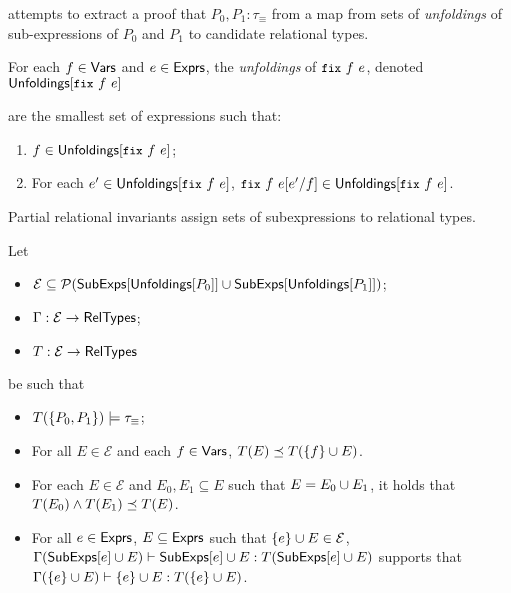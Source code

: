 \sys attempts to extract a proof that $P_0, P_1 : \tau_{\equiv}$ from
a map from sets of \emph{unfoldings} of sub-expressions of $P_0$
and $P_1$ to candidate relational types.
%
\begin{defn}
  \label{defn:unfoldings}
  For each $f \in \mathsf{Vars}$ and $e \in \mathsf{Exprs}$, the \emph{unfoldings} of
  $\fix{f}{e}$, denoted $\unfoldings{ \fix{f}{e} }$

 are the smallest set of expressions such that:
  \begin{enumerate}
  \item $f \in \unfoldings{ \fix{f}{e} }$;
  \item For each $e' \in \unfoldings{ \fix{f}{e} }$, $\replace{
      \fix{f}{e} }{ f }{ e' } \in \unfoldings{ \fix{f}{e} }$.
  \end{enumerate}
\end{defn}
%
%

%
Partial relational invariants assign sets of subexpressions to
relational types.
%
\begin{defn}
  \label{defn:inferred-invs}
  Let
  \begin{itemize}
  \item 
    $\mathcal{E} \subseteq \mathcal{P}(\mathsf{SubExps}[  \mathsf{Unfoldings}[ P_0 ]  ] \cup
      \mathsf{SubExps}[ \mathsf{Unfoldings}[ P_1 ]  ])$;
  \item
    $\Gamma : \mathcal{E} \to \mathsf{RelTypes}$;
  \item
    $T : \mathcal{E} \to \mathsf{RelTypes}$
  \end{itemize}
  be such that 
  \begin{itemize}
  \item 
    $T( \{  P_0, P_1  \} ) \models \tau_{ \equiv }$; 
  \item 
    For all $E \in \mathcal{E}$ and each $f \in \mathsf{Vars}$, $T(E) \preceq
    T(\{  f  \} \cup  E )$.
  \item 
    For each $E \in \mathcal{E}$ and $E_0, E_1 \subseteq E$ such that
    $E = E_0 \cup E_1$, it holds that $T(E_0) \land T(E_1) \preceq
    T(E)$.
  \item 
    For all $e \in \mathsf{Exprs}$, $E \subseteq \mathsf{Exprs}$ such that $\{  e  \} \cup  E
     \in \mathcal{ E }$, $\Gamma(\mathsf{SubExps}[ e ] \cup E) \vdash
    \mathsf{SubExps}[  e  ] \cup E : T( \mathsf{SubExps}[ e ] \cup E)$ supports that
    $\Gamma(\{  e  \} \cup  E ) \vdash \{  e  \} \cup  E  : T(\{  e  \} \cup  E
    )$.
  \end{itemize}
\end{defn}
%
%

